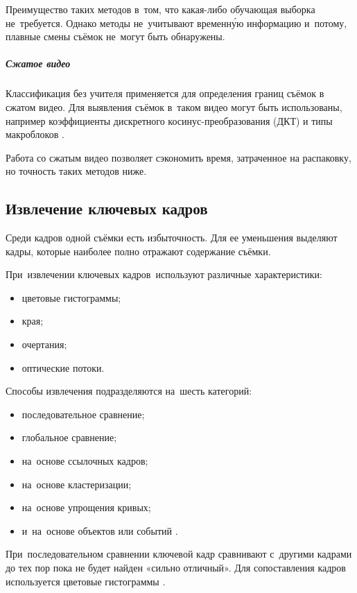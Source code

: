 Преимущество таких методов в~том, что какая-либо
обучающая выборка не~требуется.
Однако методы не~учитывают временн\'ую информацию
и~потому, плавные смены съёмок не~могут быть обнаружены.


\subparagraph{Сжатое видео}

Классификация без учителя применяется для
определения границ съёмок в сжатом видео.
Для выявления съёмок в~таком видео могут быть использованы,
например коэффициенты дискретного косинус-преобразования
(ДКТ) и типы макроблоков
\cite{Zhao:2006} \cite{Bruyne:2008} \cite{Koumaras:2006}.

Работа со сжатым видео позволяет сэкономить
время, затраченное на распаковку,
но точность таких методов ниже.


\subsection{Извлечение ключевых кадров}

Среди кадров одной съёмки есть избыточность.
Для ее уменьшения выделяют кадры,
которые наиболее полно отражают содержание съёмки.

При~извлечении ключевых кадров\
используют различные характеристики:
\begin{itemize}
    \item цветовые гистограммы;
    \item края;
    \item очертания;
    \item оптические потоки.
\end{itemize}

Способы извлечения подразделяются на~шесть категорий:
\begin{itemize}
    \item последовательное сравнение;
    \item глобальное сравнение;
    \item на~основе ссылочных кадров;
    \item на~основе кластеризации;
    \item на~основе упрощения кривых;
    \item и~на~основе объектов или событий \cite{Truong:2007}.
\end{itemize}

При~последовательном сравнении ключевой кадр сравнивают
с~другими кадрами до тех пор пока не будет найден «сильно отличный».
Для сопоставления кадров используется цветовые гистограммы \cite{Zhang:2003}.

